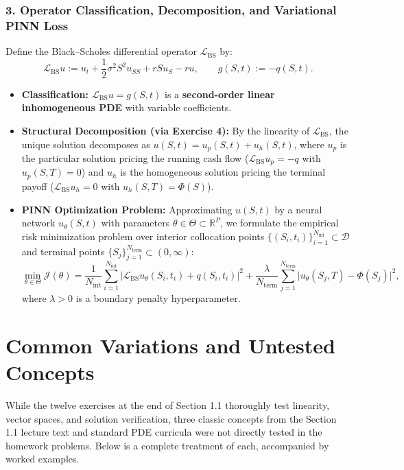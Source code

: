 \documentclass[11pt,a4paper]{article}
\begin{document}
\subsubsection*{3. Operator Classification, Decomposition, and Variational PINN Loss}
Define the Black--Scholes differential operator $\mathcal{L}_{\text{BS}}$ by:
\[
    \mathcal{L}_{\text{BS}} u := u_t + \frac{1}{2}\sigma^2 S^2 u_{SS} + r S u_S - r u, \qquad g(S, t) := -q(S, t).
\]
\begin{itemize}
    \item \textbf{Classification:} $\mathcal{L}_{\text{BS}} u = g(S, t)$ is a \textbf{second-order linear inhomogeneous PDE} with variable coefficients.
    \item \textbf{Structural Decomposition (via Exercise 4):} By the linearity of $\mathcal{L}_{\text{BS}}$, the unique solution decomposes as $u(S, t) = u_p(S, t) + u_h(S, t)$, where $u_p$ is the particular solution pricing the running cash flow ($\mathcal{L}_{\text{BS}} u_p = -q$ with $u_p(S, T) = 0$) and $u_h$ is the homogeneous solution pricing the terminal payoff ($\mathcal{L}_{\text{BS}} u_h = 0$ with $u_h(S, T) = \Phi(S)$).
    \item \textbf{PINN Optimization Problem:} Approximating $u(S, t)$ by a neural network $u_\theta(S, t)$ with parameters $\theta \in \Theta \subset \mathbb{R}^P$, we formulate the empirical risk minimization problem over interior collocation points $\{(S_i, t_i)\}_{i=1}^{N_{\text{int}}} \subset \mathcal{D}$ and terminal points $\{S_j\}_{j=1}^{N_{\text{term}}} \subset (0, \infty)$:
    \[
        \min_{\theta \in \Theta} \mathcal{J}(\theta) = \frac{1}{N_{\text{int}}}\sum_{i=1}^{N_{\text{int}}} \Big|\mathcal{L}_{\text{BS}} u_\theta(S_i, t_i) + q(S_i, t_i)\Big|^2 + \frac{\lambda}{N_{\text{term}}}\sum_{j=1}^{N_{\text{term}}} \Big|u_\theta(S_j, T) - \Phi(S_j)\Big|^2,
    \]
    where $\lambda > 0$ is a boundary penalty hyperparameter.
\end{itemize}

\newpage
\section{Common Variations and Untested Concepts}

While the twelve exercises at the end of Section 1.1 thoroughly test linearity, vector spaces, and solution verification, three classic concepts from the Section 1.1 lecture text and standard PDE curricula were not directly tested in the homework problems. Below is a complete treatment of each, accompanied by worked examples.
\end{document}
